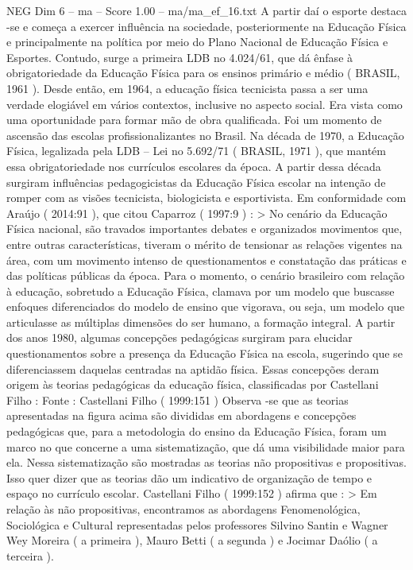 \begin{textsample}{NEG Dim 6 – ma – Score 1.00 – ma/ma\_ef\_16.txt}
A partir daí o esporte destaca -se e começa a exercer influência na sociedade, posteriormente na Educação Física e principalmente na política por meio do Plano Nacional de Educação Física e Esportes.
Contudo, surge a primeira LDB no 4.024/61, que dá ênfase à obrigatoriedade da Educação Física para os ensinos primário e médio ( BRASIL, 1961 ).
Desde então, em 1964, a educação física tecnicista passa a ser uma verdade elogiável em vários contextos, inclusive no aspecto social.
Era vista como uma oportunidade para formar mão de obra qualificada.
Foi um momento de ascensão das escolas profissionalizantes no Brasil.
Na década de 1970, a Educação Física, legalizada pela LDB – Lei no 5.692/71 ( BRASIL, 1971 ), que mantém essa obrigatoriedade nos currículos escolares da época.
A partir dessa década surgiram influências pedagogicistas da Educação Física escolar na intenção de romper com as visões tecnicista, biologicista e esportivista.
Em conformidade com Araújo ( 2014:91 ), que citou Caparroz ( 1997:9 ) : > No cenário da Educação Física nacional, são travados importantes debates e organizados movimentos que, entre outras características, tiveram o mérito de tensionar as relações vigentes na área, com um movimento intenso de questionamentos e constatação das práticas e das políticas públicas da época.
Para o momento, o cenário brasileiro com relação à educação, sobretudo a Educação Física, clamava por um modelo que buscasse enfoques diferenciados do modelo de ensino que vigorava, ou seja, um modelo que articulasse as múltiplas dimensões do ser humano, a formação integral.
A partir dos anos 1980, algumas concepções pedagógicas surgiram para elucidar questionamentos sobre a presença da Educação Física na escola, sugerindo que se diferenciassem daquelas centradas na aptidão física.
Essas concepções deram origem às teorias pedagógicas da educação física, classificadas por Castellani Filho : Fonte : Castellani Filho ( 1999:151 ) Observa -se que as teorias apresentadas na figura acima são divididas em abordagens e concepções pedagógicas que, para a metodologia do ensino da Educação Física, foram um marco no que concerne a uma sistematização, que dá uma visibilidade maior para ela.
Nessa sistematização são mostradas as teorias não propositivas e propositivas.
Isso quer dizer que as teorias dão um indicativo de organização de tempo e espaço no currículo escolar.
Castellani Filho ( 1999:152 ) afirma que : > Em relação às não propositivas, encontramos as abordagens Fenomenológica, Sociológica e Cultural representadas pelos professores Silvino Santin e Wagner Wey Moreira ( a primeira ), Mauro Betti ( a segunda ) e Jocimar Daólio ( a terceira ).

\end{textsample}
